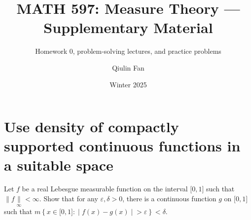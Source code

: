 \documentclass{qlnotes-export}
\title{MATH 597: Measure Theory --- Supplementary Material}
\subtitle{Homework 0, problem-solving lectures, and practice problems}
\author{Qiulin Fan}
\date{Winter 2025}
\begin{document}
\mainmatter
\chapter{Use density of compactly supported continuous functions in a suitable space}\label{use-density-of-compactly-supported-continuous-functions-in-a-suitable-space}

Let \(f\) be a real Lebesgue measurable function on the interval \(\lbrack 0,1\rbrack\) such that \(\parallel f\underset{\infty}{\parallel} < \infty\). Show that for any \(\varepsilon,\delta > 0\), there is a continuous function \(g\) on \(\lbrack 0,1\rbrack\) such that \(m\left\{ x \in \lbrack 0,1\rbrack: \middle| f(x) - g(x) \middle| > \varepsilon \right\} < \delta\).
\end{document}
